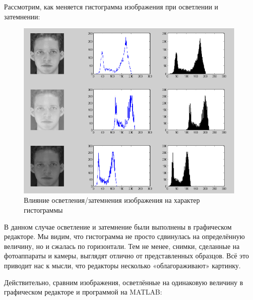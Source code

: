 \documentclass[a4paper,12pt,titlpage]{posobie}
\begin{document}
Рассмотрим, как меняется гистограмма изображения при осветлении и затемнении:
\begin{figure}[h]
   \includegraphics[width=\textwidth]{report/pic_1.png}
   \caption{Влияние осветления/затемнения изображения на характер гистограммы}\label{fig:research_faces}
\end{figure}
В данном случае осветление и затемнение были выполнены в графическом редакторе. Мы видим, что гистограмма не просто 
сдвинулась на определённую величину, но и сжалась по горизонтали. Тем не менее, снимки, сделанные на фотоаппараты и 
камеры, выглядят отлично от представленных образцов. Всё это приводит нас к мысли, что редакторы несколько «облагораживают» картинку. 

Действительно, сравним изображения, осветлённые на одинаковую величину в графическом редакторе и программой на MATLAB:
\end{document}

